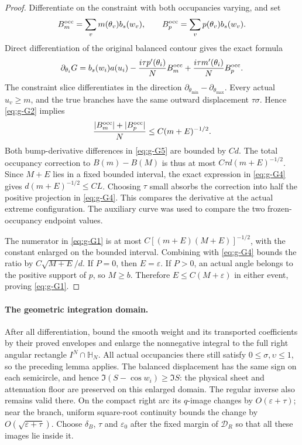 \documentclass[11pt]{article}
\numberwithin{equation}{section}
\theoremstyle{remark}\newtheorem{remark}[theorem]{Remark}
\begin{document}
\begin{proof}
Differentiate on the constraint with both occupancies varying, and set
\[
 B_m^{\rm occ}=\sum_v m(\theta_v)b_s(w_v),\qquad
 B_p^{\rm occ}=\sum_v p(\theta_v)b_s(w_v).
\]
Direct differentiation of the original balanced contour gives
the exact formula
\begin{equation}\label{eq:g-G5}
\partial_{\theta_i}G
 =b_s(w_i)a(u_i)
 -\frac{i\tau p'(\theta_i)}N B_m^{\rm occ}
 +\frac{i\tau m'(\theta_i)}N B_p^{\rm occ}.
\end{equation}
The constraint slice differentiates in the direction
$\partial_{\theta_{\min}}-\partial_{\theta_{\max}}$.
Every actual $u_v\ge m$, and the true branches have the same
outward displacement $\tau\sigma$.  Hence \eqref{eq:g-G2} implies
\[
 \frac{|B_m^{\rm occ}|+|B_p^{\rm occ}|}{N}
 \le C(m+E)^{-1/2}.
\]
Both bump-derivative differences in \eqref{eq:g-G5} are bounded by $Cd$.
The total occupancy correction to $B(m)-B(M)$ is thus at most
$C\tau d(m+E)^{-1/2}$.
Since $M+E$ lies in a fixed bounded interval, the exact
expression in \eqref{eq:g-G4} gives
$d(m+E)^{-1/2}\le CL$.  Choosing $\tau$ small absorbs the
correction into half the positive projection in \eqref{eq:g-G4}.
This compares the derivative at the actual extreme configuration.
The auxiliary curve was used to compare the two frozen-occupancy
endpoint values.

The numerator in \eqref{eq:g-G1} is at most
$C[(m+E)(M+E)]^{-1/2}$, with the constant enlarged on the bounded interval.
Combining with \eqref{eq:g-G4} bounds the ratio by $C\sqrt{M+E}/d$.
If $P=0$, then $E=\varepsilon$.  If $P>0$, an actual angle
belongs to the positive support of $p$, so $M\ge b$.
Therefore $E\le C(M+\varepsilon)$ in either event, proving
\eqref{eq:g-G1}.
\end{proof}



\paragraph{The geometric integration domain.}\label{par:right-rectangle}
After all differentiation, bound the smooth weight and its
transported coefficients by their proved envelopes and enlarge
the nonnegative integral to the full right angular rectangle
$I^N\cap\mathbb H_N$. All actual occupancies there still satisfy
$0\le\sigma,\upsilon\le1$, so the preceding lemma applies.
The balanced displacement has the same sign on each semicircle,
and hence $\Im(S-\cos w_i)\ge\Im S$: the physical sheet and
attenuation floor are preserved on this enlarged domain.
The regular inverse also remains valid there. On the compact
right arc its $q$-image changes by $O(\varepsilon+\tau)$;
near the branch, uniform square-root continuity bounds the
change by $O(\sqrt{\varepsilon+\tau})$. Choose $\delta_B$,
$\tau$ and $\varepsilon_0$ after the fixed margin of
$\mathcal D_R$ so that all these images lie inside it.
\end{document}
